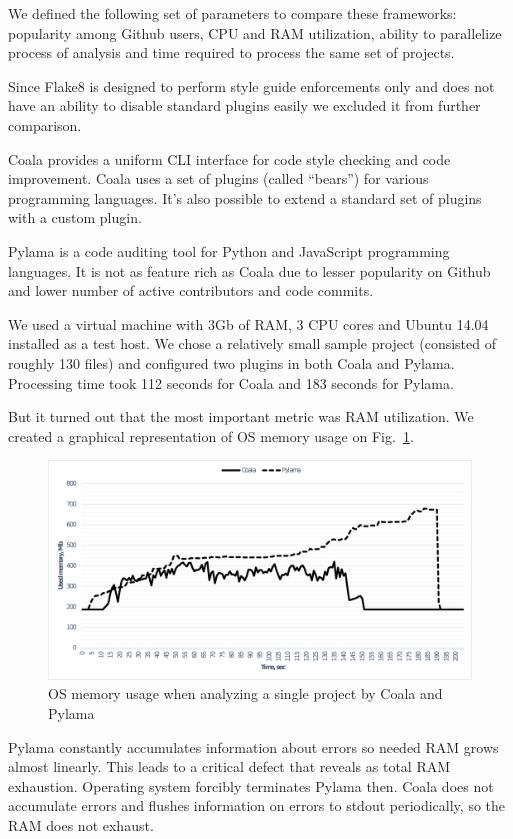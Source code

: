 \documentclass[runningheads,a4paper]{llncs}
\begin{document}
We defined the following set of parameters to compare these frameworks:
popularity among Github \cite{item16} users, CPU and RAM utilization, ability to
parallelize process of analysis and time required to process the same set of projects.

Since Flake8 is designed to perform style guide enforcements only and does not
have an ability to disable standard plugins easily we excluded it from further comparison.

Coala provides a uniform CLI interface for code style checking and code
improvement. Coala uses a set of plugins (called “bears”) for various
programming languages. It’s also possible to extend a standard set of
plugins with a custom plugin.

Pylama is a code auditing tool for Python and JavaScript programming
languages. It is not as feature rich as Coala due to lesser popularity
on Github and lower number of active contributors and code commits.

We used a virtual machine with 3Gb of RAM, 3 CPU cores and Ubuntu 14.04
installed as a test host. We chose a relatively small sample project (consisted
of roughly 130 files) and configured two plugins in both Coala and Pylama.
Processing time took 112 seconds for Coala and 183 seconds for Pylama.

But it turned out that the most important metric was RAM utilization. We created
a graphical representation of OS memory usage on Fig.~\ref{fig:memusage}.

%
\begin{figure}
	\centering
	\includegraphics[width=\linewidth]{memusage}
	\caption{OS memory usage when analyzing a single project by Coala and Pylama}
	\label{fig:memusage}
\end{figure}
%

Pylama constantly accumulates information about errors so needed RAM grows
almost linearly. This leads to a critical defect that reveals as total RAM
exhaustion. Operating system forcibly terminates Pylama then. Coala does not
accumulate errors and flushes information on errors to stdout periodically, so
the RAM does not exhaust.
\end{document}

